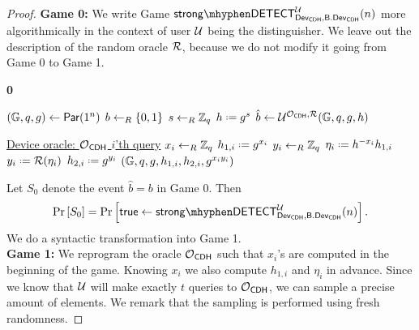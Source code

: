 \begin{proof}
\noindent\textbf{Game 0:} We write Game $\strongdetect{\dev_{\CDH}}{\bbdev_{\CDH}}{\user}$ more algorithmically in the context of user $\mathcal{U}$ being the distinguisher. We leave out the description of the random oracle $\operatorname{\mathcal{R}}$, because we do not modify it going from Game 0 to Game 1. \begin{comment} We note that $\RO$ remembers the query from made by $\oracle_{\CDH}$ and therefore maintain consistency between the answers from $\oracle_{\CDH}$ and $\RO$. \end{comment}

\vspace*{-.3cm}
\begin{Algorithm}[]{6cm}
\captionGame
\caption{\textbf{0}}
\label{alg:CDHgame1}
\begin{algorithmic}[1]
\State $(\mathbb{G},q,g)\leftarrow\operatorname{\mathsf{Par}}(1^n)$
\State $b\leftarrow_R\left\{0,1\right\}$
\State $s\leftarrow_R\mathbb{Z}_q$
\State $h \defeq g^s$
\State $\hat{b}\leftarrow\mathcal{U}^{\operatorname{\mathcal{O}}_{\mathsf{CDH}},\operatorname{\mathcal{R}}}(\mathbb{G},q,g,h)$
\Statex\hrulefill
\end{algorithmic}
\begin{algorithmic}[1]
\Statex \underline{Device oracle: \textbf{$\operatorname{\mathcal{O}}_{\mathsf{CDH}}$} $i$'th query}
\Statex
\State $x_i\leftarrow_R\mathbb{Z}_q$
\State $h_{1,i} \defeq g^{x_i}$
\State $y_i\leftarrow_R\mathbb{Z}_q$
\Else
\State $\eta_i \defeq h^{-x_i}h_{1,i}$
\State $y_i \defeq \RO(\eta_i)$
\EndIf
\State $h_{2,i} \defeq g^{y_i}$
\State \Ret $(\mathbb{G},q,g,h_{1,i},h_{2,i},g^{x_iy_i})$
\end{algorithmic}
\end{Algorithm}
\begin{comment}
\begin{algorithmic}[1]
\Statex \underline{Random oracle: \textbf{$\RO(\lambda)$}}
\Statex
\State If $(\lambda,y)$ is in $Q_{\RO}$ for some $y$ \Ret $y$
\State $y\unileft \Zq$
\State Store $(\lambda,y)$ in $Q_{\RO}$
\State \Ret $y$
\end{algorithmic}
\end{comment}

Let $S_0$ denote the event $\hat{b} = b$ in Game 0. Then 
\begin{align*}
	\prob{S_0} = \prob{\true\leftarrow\strongdetect{\dev_{\CDH}}{\bbdev_{\CDH}}{\user}}.
\end{align*} 
We do a syntactic transformation into Game 1. \\

\noindent\textbf{Game 1:} We reprogram the oracle $\operatorname{\mathcal{O}}_{\mathsf{CDH}}$ such that $x_i$'s are computed in the beginning of the game. Knowing $x_i$ we also compute $h_{1,i}$ and $\eta_i$ in advance. Since we know that $\mathcal{U}$ will make exactly $t$ queries to $\operatorname{\mathcal{O}}_{\mathsf{CDH}}$, we can sample a precise amount of elements. We remark that the sampling is performed using fresh randomness.


\end{proof}
